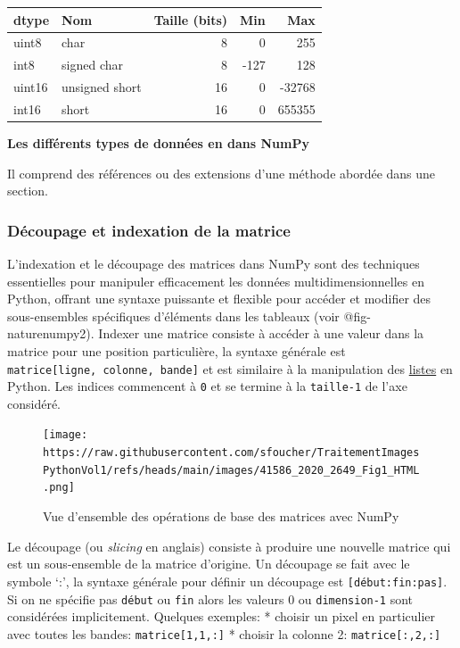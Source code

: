 \documentclass[11pt]{article}
\newcommand{\prompt}[4]{
        {\ttfamily\llap{{\color{#2}[#3]:\hspace{3pt}#4}}\vspace{-\baselineskip}}
    }
\begin{document}
            
\prompt{Out}{outcolor}{11}{}
    
    \begin{longtable}[]{@{}llrrr@{}}
\toprule
dtype & Nom & Taille (bits) & Min & Max \\
\midrule
\endhead
uint8 & char & 8 & 0 & 255 \\
int8 & signed char & 8 & -127 & 128 \\
uint16 & unsigned short & 16 & 0 & -32768 \\
int16 & short & 16 & 0 & 655355 \\
\bottomrule
\end{longtable}

    

    \textbf{Les différents types de données en dans NumPy}

Il comprend des références ou des extensions d'une méthode abordée dans
une section.

\hypertarget{duxe9coupage-et-indexation-de-la-matrice}{%
\subsubsection{Découpage et indexation de la
matrice}\label{duxe9coupage-et-indexation-de-la-matrice}}

L'indexation et le découpage des matrices dans NumPy sont des techniques
essentielles pour manipuler efficacement les données
multidimensionnelles en Python, offrant une syntaxe puissante et
flexible pour accéder et modifier des sous-ensembles spécifiques
d'éléments dans les tableaux (voir @fig-naturenumpy2). Indexer une
matrice consiste à accéder à une valeur dans la matrice pour une
position particulière, la syntaxe générale est
\texttt{matrice{[}ligne,\ colonne,\ bande{]}} et est similaire à la
manipulation des
\href{https://docs.python.org/fr/3/tutorial/introduction.html\#lists}{listes}
en Python. Les indices commencent à \texttt{0} et se termine à la
\texttt{taille-1} de l'axe considéré.

\begin{figure}
\hypertarget{fig-naturenumpy2}{%
\centering
\texttt{[image: https://raw.githubusercontent.com/sfoucher/TraitementImagesPythonVol1/refs/heads/main/images/41586\_2020\_2649\_Fig1\_HTML.png]}
\caption{Vue d'ensemble des opérations de base des matrices avec
NumPy}\label{fig-naturenumpy2}
}
\end{figure}

Le découpage (ou \emph{slicing} en anglais) consiste à produire une
nouvelle matrice qui est un sous-ensemble de la matrice d'origine. Un
découpage se fait avec le symbole `:', la syntaxe générale pour définir
un découpage est \texttt{{[}début:fin:pas{]}}. Si on ne spécifie pas
\texttt{début} ou \texttt{fin} alors les valeurs 0 ou
\texttt{dimension-1} sont considérées implicitement. Quelques exemples:
* choisir un pixel en particulier avec toutes les bandes:
\texttt{matrice{[}1,1,:{]}} * choisir la colonne 2:
\texttt{matrice{[}:,2,:{]}}
\end{document}
